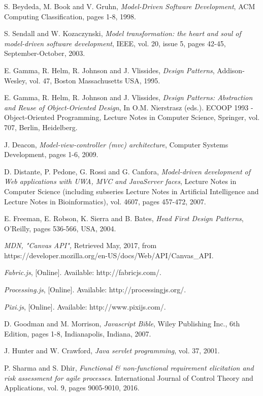 \begin{thebibliography}{1}
	 S. Beydeda, M. Book and V. Gruhn, {\em Model-Driven Software Development}, ACM Computing Classification, pages 1-8, 1998.
	
	 S. Sendall and W. Kozaczynski, {\em Model transformation: the heart and soul of model-driven software development},  IEEE, vol. 20, issue 5, pages 42-45, September-October, 2003.
	
	 E. Gamma, R. Helm, R. Johnson and J. Vlissides, {\em Design Patterns}, Addison-Wesley, vol. 47, Boston Massachusetts USA, 1995.
	
	 E. Gamma, R. Helm, R. Johnson and J. Vlissides, {\em Design Patterns: Abstraction and Reuse of Object-Oriented Design}, In O.M. Nierstrasz (eds.). ECOOP 1993 - Object-Oriented Programming, Lecture Notes in Computer Science, Springer, vol. 707, Berlin, Heidelberg.
	
	 J. Deacon, { \em Model-view-controller (mvc) architecture}, Computer Systems Development, pages 1-6, 2009.
	
	 D. Distante, P. Pedone, G. Rossi and G. Canfora, { \em Model-driven development of Web applications with UWA, MVC and JavaServer faces}, Lecture Notes in Computer Science (including subseries Lecture Notes in Artificial Intelligence and Lecture Notes in Bioinformatics), vol. 4607, pages 457-472, 2007.
	
	 E. Freeman, E. Robson, K. Sierra and B. Bates, { \em Head First Design Patterns}, O'Reilly, pages 536-566, USA, 2004.
	
	 {\em MDN, "Canvas API",} Retrieved May, 2017, from https://developer.mozilla.org/en-US/docs/Web/API/Canvas\_API.
	
	 {\em Fabric.js}, [Online]. Available: http://fabricjs.com/.
	
	 {\em Processing.js}, [Online]. Available: http://processingjs.org/.
	
	 {\em Pixi.js}, [Online]. Available: http://www.pixijs.com/.
	
	 D. Goodman and M. Morrison, {\em Javascript Bible}, Wiley Publishing Inc., 6th Edition, pages 1-8, Indianapolis, Indiana, 2007.
	
	 J. Hunter and W. Crawford, {\em Java servlet programming}, vol. 37, 2001.
	
	 P. Sharma and S. Dhir, {\em Functional \& non-functional requirement elicitation and risk assessment for agile processes}. International Journal of Control Theory and Applications, vol. 9, pages 9005-9010, 2016.
	

\end{thebibliography}
